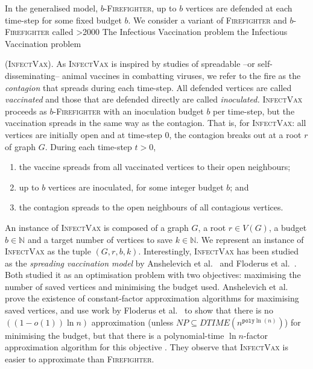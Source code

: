 \documentclass[unknownkeysallowed]{article}
\theoremstyle{definition}\newtheorem{strategy}{Strategy}
\theoremstyle{definition}\newtheorem{notation}{Notation}[theorem]
\newcommand*{\Fire}{\textup{\textsc{Firefighter}}\xspace} %
\newcommand*{\bFire}{$b$-\Fire} %
\newcommand*{\IV}{\textup{\textsc{InfectVax}}\xspace}
\newcommand*{\IVLong}{%
  \ifnum\spacefactor>2000
    The Infectious Vaccination problem%
  \else
    the Infectious Vaccination problem%
  \fi
  \xspace
}
\begin{document}
In the generalised model, \bFire, up to $b$ vertices are defended at each time-step for some fixed budget $b$. We consider a variant of \Fire and \bFire called \IVLong (\IV). As \IV is inspired by studies of spreadable --or self-disseminating-- animal vaccines in combatting viruses, we refer to the fire as the \emph{contagion} that spreads during each time-step. All defended vertices are called \emph{vaccinated} and those that are defended directly are called \emph{inoculated.} \IV proceeds as \bFire with an inoculation budget $b$ per time-step, but the vaccination spreads in the same way as the contagion. That is, for \IV: all vertices are initially open and at time-step $0$, the contagion breaks out at a root $r$ of graph $G$.  During each time-step $t > 0$,
\begin{enumerate}
    \item the vaccine spreads from all vaccinated vertices to their open neighbours;
    \item up to $b$ vertices are inoculated, for some integer budget $b$; and
    \item the contagion spreads to the open neighbours of all contagious vertices. 
\end{enumerate}
An instance of \IV is composed of a graph $G$, a root $r\in V(G)$, a budget $b\in\mathbb{N}$ and a target number of vertices to save $k\in\mathbb{N}$. We represent an instance of \IV as the tuple $(G, r, b, k)$.
Interestingly, \IV has been studied as the \emph{spreading vaccination model} by Anshelevich et al.\ \cite{anshelevich_2012} and Floderus et al.\ \cite{floderus_2011}. Both studied it as an optimisation problem with two objectives: maximising the number of saved vertices and minimising the budget used.
Anshelevich et al.\ \cite{anshelevich_2012} prove the existence of constant-factor approximation algorithms for maximising saved vertices, and use work by Floderus et al.\ \cite{floderus_2011} to show that there is no $((1 - o(1)) \ln n)$ approximation (unless $NP \subseteq DTIME(n^{\texttt{poly}\ln(n)})$) for minimising the budget, but that there is a polynomial-time $\ln n$-factor approximation algorithm for this objective \cite{anshelevich_2012}.
They observe that \IV is easier to approximate than \Fire.
\end{document}
